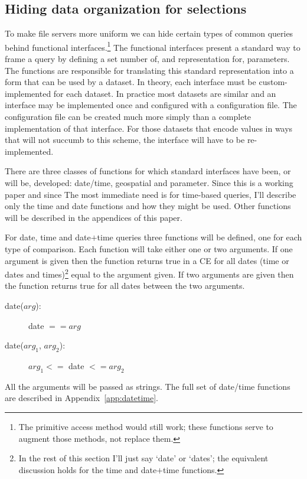 \documentclass[12pt]{article}
\begin{document}
\subsection{Hiding data organization for selections}
\label{sec:selection}

To make file servers more uniform we can hide certain types of common queries
behind functional interfaces.\footnote{The primitive access method would
  still work; these functions serve to augment those methods, not replace
  them.} The functional interfaces present a standard way to frame a query by
defining a set number of, and representation for, parameters. The functions
are responsible for translating this standard representation into a form that
can be used by a dataset. In theory, each interface must be
custom-implemented for each dataset. In practice most datasets are similar
and an interface may be implemented once and configured with a configuration
file. The configuration file can be created much more simply than a complete
implementation of that interface.  For those datasets that encode values in
ways that will not succumb to this scheme, the interface will have to be
re-implemented.

There are three classes of functions for which standard interfaces have been,
or will be, developed: date/time, geospatial and parameter. Since this is a
working paper and since The most immediate need is for time-based queries,
I'll describe only the time and date functions and how they might be used.
Other functions will be described in the appendices of this paper.

For date, time and date$+$time queries three functions will be defined, one
for each type of comparison. Each function will take either one or two
arguments. If one argument is given then the function returns true in a CE
for all dates (time or dates and times)\footnote{In the rest of this section
  I'll just say `date' or `dates'; the equivalent discussion holds for the
  time and date$+$time functions.} equal to the argument given. If two
arguments are given then the function returns true for all dates between the
two arguments.

\begin{description}
  \item [date($arg$):] date $== arg$
  \item [date($arg_{1}$, $arg_{2}$):] $arg_{1} <=$ date $<= arg_{2}$
\end{description}

All the arguments will be passed as strings. The full set of date/time
functions are described in Appendix~\ref{app:datetime}.
\end{document}
